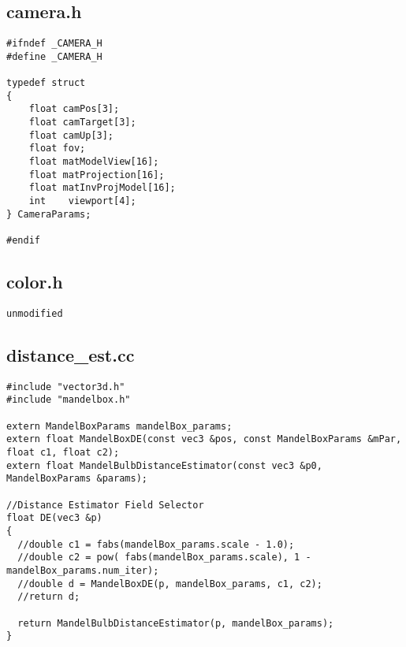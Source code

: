 \documentclass[]{article}
\begin{document}
\subsection*{camera.h}
\begin{Verbatim}[fontsize= \footnotesize, tabsize=4]
#ifndef _CAMERA_H
#define _CAMERA_H

typedef struct
{
	float camPos[3];
	float camTarget[3];
	float camUp[3];
	float fov;
	float matModelView[16];
	float matProjection[16];
	float matInvProjModel[16]; 
	int    viewport[4];
} CameraParams;

#endif
\end{Verbatim}

\subsection*{color.h}
\begin{Verbatim}[fontsize= \footnotesize, tabsize=4]
unmodified
\end{Verbatim}

\subsection*{distance\_est.cc}
\begin{Verbatim}[fontsize= \footnotesize, tabsize=4]
#include "vector3d.h"
#include "mandelbox.h"

extern MandelBoxParams mandelBox_params;
extern float MandelBoxDE(const vec3 &pos, const MandelBoxParams &mPar, float c1, float c2);
extern float MandelBulbDistanceEstimator(const vec3 &p0, MandelBoxParams &params);

//Distance Estimator Field Selector
float DE(vec3 &p)
{
  //double c1 = fabs(mandelBox_params.scale - 1.0);
  //double c2 = pow( fabs(mandelBox_params.scale), 1 - mandelBox_params.num_iter);
  //double d = MandelBoxDE(p, mandelBox_params, c1, c2);
  //return d;

  return MandelBulbDistanceEstimator(p, mandelBox_params);
}
\end{Verbatim}
\end{document}
